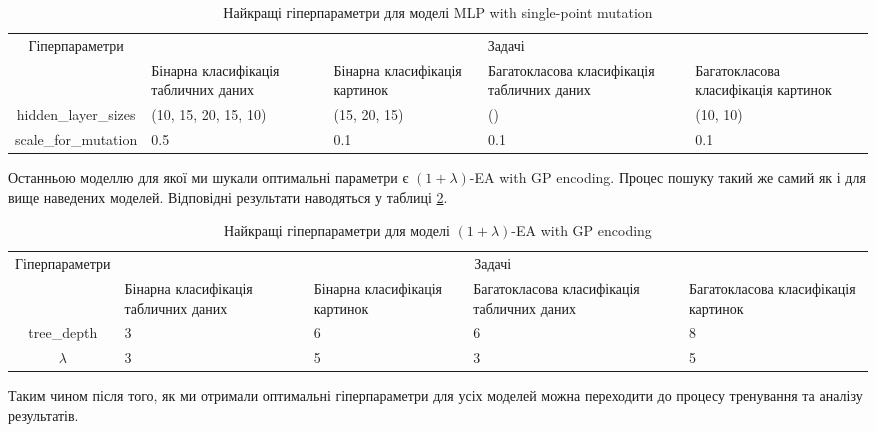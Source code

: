 \begin{table}[ht]
	\centering
	\begin{adjustbox}{max width=\textwidth}
		\begin{tabular}{|c|p{3cm}|p{3cm}|p{3cm}|p{3cm}|}
			\hline \multirow{2}{*}{Гіперпараметри} & \multicolumn{4}{c|}{Задачі} \\
			\cline{2-5} & Бінарна класифікація табличних даних & Бінарна класифікація картинок & Багатокласова класифікація табличних даних & Багатокласова класифікація картинок \\
			\hline hidden\_layer\_sizes & (10, 15, 20, 15, 10) & (15, 20, 15) & () & (10, 10) \\
			\hline scale\_for\_mutation & 0.5 & 0.1 & 0.1 & 0.1 \\
			\hline
		\end{tabular}
	\end{adjustbox}
	\caption{Найкращі гіперпараметри для моделі MLP with single-point mutation}
	\label{tab_hyperparameters_for_mlp_with_sp_mut}
\end{table}

Останньою моделлю для якої ми шукали оптимальні параметри є $(1+\lambda)$-EA with GP encoding. Процес пошуку такий же самий як і для вище наведених моделей. Відповідні результати наводяться у таблиці \ref{tab_hyperparameters_for_evol_alg}.

\begin{table}[ht]
	\centering
	\begin{adjustbox}{max width=\textwidth}
		\begin{tabular}{|c|p{3cm}|p{3cm}|p{3cm}|p{3cm}|}
			\hline \multirow{2}{*}{Гіперпараметри} & \multicolumn{4}{c|}{Задачі} \\
			\cline{2-5} & Бінарна класифікація табличних даних & Бінарна класифікація картинок & Багатокласова класифікація табличних даних & Багатокласова класифікація картинок \\
			\hline tree\_depth & 3 & 6 & 6 & 8 \\
			\hline $\lambda$ & 3 & 5 & 3 & 5 \\
			\hline
		\end{tabular}
	\end{adjustbox}
	\caption{Найкращі гіперпараметри для моделі $(1+\lambda)$-EA with GP encoding}
	\label{tab_hyperparameters_for_evol_alg}
\end{table}

Таким чином після того, як ми отримали оптимальні гіперпараметри для усіх моделей можна переходити до процесу тренування та аналізу результатів.

